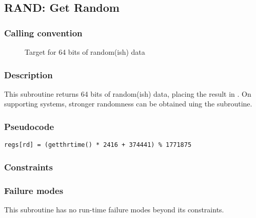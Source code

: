 \clearpage
{}
{}
\label{insn:and}
\subsection*{RAND: Get Random}

\subsubsection*{Calling convention}

\begin{description}
\item[] Target for 64 bits of random(ish) data
\end{description}

\subsubsection*{Description}

This subroutine returns 64 bits of random(ish) data, placing the result in
.
On supporting systems, stronger randomness can be obtained uing the
\hyperref[subr:random]{} subroutine.

\subsubsection*{Pseudocode}

\begin{verbatim}
regs[rd] = (getthrtime() * 2416 + 374441) % 1771875
\end{verbatim}

\subsubsection*{Constraints}

\subsubsection*{Failure modes}

This subroutine has no run-time failure modes beyond its constraints.
